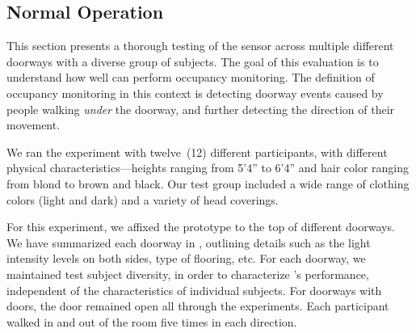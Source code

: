 


\subsection{Normal Operation}
\label{subsec:normal operation}

This section presents a thorough testing of the \sysname sensor across multiple different doorways with a diverse group of subjects.
The goal of this evaluation is to understand how well \sysname can perform occupancy monitoring.
The definition of occupancy monitoring in this context is detecting doorway events caused by people walking \textit{under} the doorway, and further detecting the direction of their movement.

We ran the experiment with twelve~(12) different participants, with different physical characteristics---heights ranging from 5'4'' to 6'4'' and hair color ranging from blond to brown and black.
Our test group included a wide range of clothing colors (light and dark) and a variety of head coverings.


For this experiment, we affixed the \sysname prototype to the top of \numDoors different doorways.
We have summarized each doorway in , outlining details such as the light intensity levels on both sides, type of flooring, etc.
For each doorway, we maintained test subject diversity, in order to characterize \sysname's performance, independent of the characteristics of individual subjects.
For doorways with doors, the door remained open all through the experiments.
Each participant walked in and out of the room five times in each direction.

